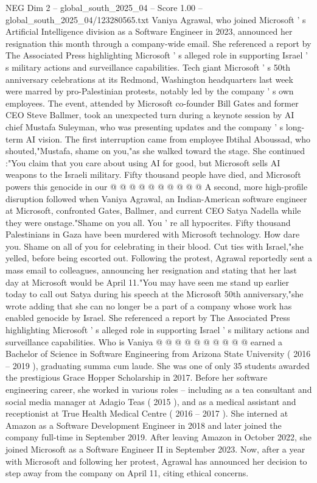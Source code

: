 \begin{textsample}{NEG Dim 2 – global\_south\_2025\_04 – Score 1.00 – global\_south\_2025\_04/123280565.txt}  \label{ex:f2_neg_102}
Vaniya Agrawal, who joined Microsoft ' s Artificial Intelligence division as a Software Engineer in 2023, announced her resignation this month through a company-wide email.
She referenced a report by The Associated Press highlighting Microsoft ' s alleged role in supporting Israel ' s military actions and surveillance capabilities.
Tech giant Microsoft ' s 50th anniversary celebrations at its Redmond, Washington headquarters last week were marred by pro-Palestinian protests, notably led by the company ' s own employees.
The event, attended by Microsoft co-founder Bill Gates and former CEO Steve Ballmer, took an unexpected turn during a keynote session by AI chief Mustafa Suleyman, who was presenting updates and the company ' s long-term AI vision.
The first interruption came from employee Ibtihal Aboussad, who shouted,"Mustafa, shame on you,"as she walked toward the stage.
She continued :"You claim that you care about using AI for good, but Microsoft sells AI weapons to the Israeli military.
Fifty thousand people have died, and Microsoft powers this genocide in our @ @ @ @ @ @ @ @ @ @ A second, more high-profile disruption followed when Vaniya Agrawal, an Indian-American software engineer at Microsoft, confronted Gates, Ballmer, and current CEO Satya Nadella while they were onstage."Shame on you all.
You ' re all hypocrites.
Fifty thousand Palestinians in Gaza have been murdered with Microsoft technology.
How dare you.
Shame on all of you for celebrating in their blood.
Cut ties with Israel,"she yelled, before being escorted out.
Following the protest, Agrawal reportedly sent a mass email to colleagues, announcing her resignation and stating that her last day at Microsoft would be April 11."You may have seen me stand up earlier today to call out Satya during his speech at the Microsoft 50th anniversary,"she wrote adding that she can no longer be a part of a company whose work has enabled genocide by Israel.
She referenced a report by The Associated Press highlighting Microsoft ' s alleged role in supporting Israel ' s military actions and surveillance capabilities.
Who is Vaniya @ @ @ @ @ @ @ @ @ @ earned a Bachelor of Science in Software Engineering from Arizona State University ( 2016 -- 2019 ), graduating summa cum laude.
She was one of only 35 students awarded the prestigious Grace Hopper Scholarship in 2017.
Before her software engineering career, she worked in various roles -- including as a tea consultant and social media manager at Adagio Teas ( 2015 ), and as a medical assistant and receptionist at True Health Medical Centre ( 2016 -- 2017 ).
She interned at Amazon as a Software Development Engineer in 2018 and later joined the company full-time in September 2019.
After leaving Amazon in October 2022, she joined Microsoft as a Software Engineer II in September 2023.
Now, after a year with Microsoft and following her protest, Agrawal has announced her decision to step away from the company on April 11, citing ethical concerns.

\end{textsample}

